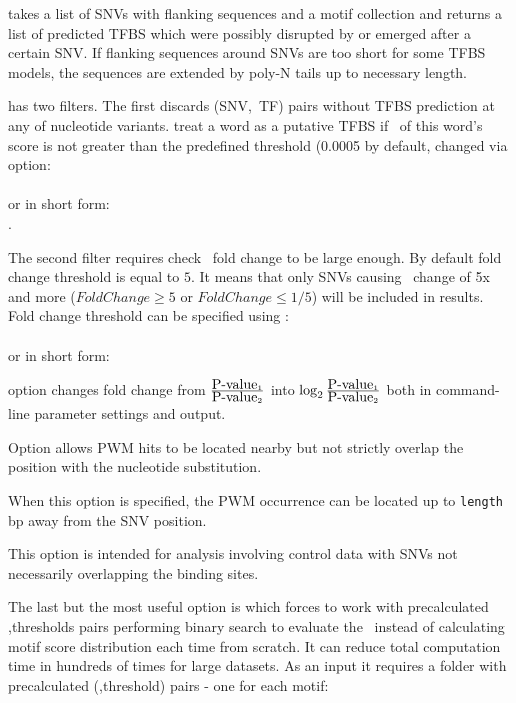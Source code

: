  takes a list of SNVs with flanking sequences and a motif collection and returns a list of predicted TFBS which were possibly disrupted by or emerged after a certain SNV.
If flanking sequences around SNVs are too short for some TFBS models, the sequences are extended by poly-N tails up to necessary length.
\usageheader
{}


 has two filters. The first discards (SNV,~TF) pairs without TFBS prediction at any of nucleotide variants.  treat a word as a putative TFBS if \pvalue\ of this word's score is not greater than the predefined threshold (0.0005 by default, changed via  option:\\
\\
or in short form:\\
.

The second filter requires check \pvalue\ fold change to be large enough. By default fold change threshold is equal to $5$. It means that only SNVs causing \pvalue\ change of 5x and more ($FoldChange \ge 5$ or $FoldChange \le 1/5$) will be included in results. Fold change threshold can be specified using :\\
\\
or in short form:\\

 option changes fold change from $\frac{\mbox{P-value}{}_1}{\mbox{P-value}{}_2}$ into
$\log_{2}{\frac{\mbox{P-value}{}_1}{\mbox{P-value}{}_2}}$ both in command-line parameter settings and output.

Option  allows PWM hits to be located nearby but not strictly overlap the position with the nucleotide substitution.

When this option is specified, the PWM occurrence can be located up to \texttt{length} bp away from the SNV position.

This option is intended for analysis involving control data with SNVs not necessarily overlapping the binding sites.


The last but the most useful option is  which forces  to work with precalculated \pvalue,thresholds pairs performing binary search to evaluate the \pvalue\ instead of calculating motif score distribution each time from scratch. It can reduce total computation time in hundreds of times for large datasets.
As an input it requires a folder with precalculated (\pvalue,threshold) pairs - one for each motif:\\

